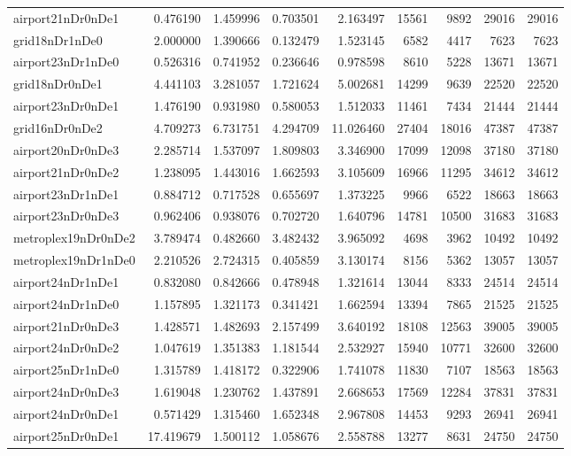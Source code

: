 \begin{longtable}{|l|r|r|r|r|r|r|r|r|}
airport21nDr0nDe1 & 0.476190 & 1.459996 & 0.703501 & 2.163497 & 15561 & 9892 & 29016 & 29016 \\
grid18nDr1nDe0 & 2.000000 & 1.390666 & 0.132479 & 1.523145 & 6582 & 4417 & 7623 & 7623 \\
airport23nDr1nDe0 & 0.526316 & 0.741952 & 0.236646 & 0.978598 & 8610 & 5228 & 13671 & 13671 \\
grid18nDr0nDe1 & 4.441103 & 3.281057 & 1.721624 & 5.002681 & 14299 & 9639 & 22520 & 22520 \\
airport23nDr0nDe1 & 1.476190 & 0.931980 & 0.580053 & 1.512033 & 11461 & 7434 & 21444 & 21444 \\
grid16nDr0nDe2 & 4.709273 & 6.731751 & 4.294709 & 11.026460 & 27404 & 18016 & 47387 & 47387 \\
airport20nDr0nDe3 & 2.285714 & 1.537097 & 1.809803 & 3.346900 & 17099 & 12098 & 37180 & 37180 \\
airport21nDr0nDe2 & 1.238095 & 1.443016 & 1.662593 & 3.105609 & 16966 & 11295 & 34612 & 34612 \\
airport23nDr1nDe1 & 0.884712 & 0.717528 & 0.655697 & 1.373225 & 9966 & 6522 & 18663 & 18663 \\
airport23nDr0nDe3 & 0.962406 & 0.938076 & 0.702720 & 1.640796 & 14781 & 10500 & 31683 & 31683 \\
metroplex19nDr0nDe2 & 3.789474 & 0.482660 & 3.482432 & 3.965092 & 4698 & 3962 & 10492 & 10492 \\
metroplex19nDr1nDe0 & 2.210526 & 2.724315 & 0.405859 & 3.130174 & 8156 & 5362 & 13057 & 13057 \\
airport24nDr1nDe1 & 0.832080 & 0.842666 & 0.478948 & 1.321614 & 13044 & 8333 & 24514 & 24514 \\
airport24nDr1nDe0 & 1.157895 & 1.321173 & 0.341421 & 1.662594 & 13394 & 7865 & 21525 & 21525 \\
airport21nDr0nDe3 & 1.428571 & 1.482693 & 2.157499 & 3.640192 & 18108 & 12563 & 39005 & 39005 \\
airport24nDr0nDe2 & 1.047619 & 1.351383 & 1.181544 & 2.532927 & 15940 & 10771 & 32600 & 32600 \\
airport25nDr1nDe0 & 1.315789 & 1.418172 & 0.322906 & 1.741078 & 11830 & 7107 & 18563 & 18563 \\
airport24nDr0nDe3 & 1.619048 & 1.230762 & 1.437891 & 2.668653 & 17569 & 12284 & 37831 & 37831 \\
airport24nDr0nDe1 & 0.571429 & 1.315460 & 1.652348 & 2.967808 & 14453 & 9293 & 26941 & 26941 \\
airport25nDr0nDe1 & 17.419679 & 1.500112 & 1.058676 & 2.558788 & 13277 & 8631 & 24750 & 24750 \\

\end{longtable}
